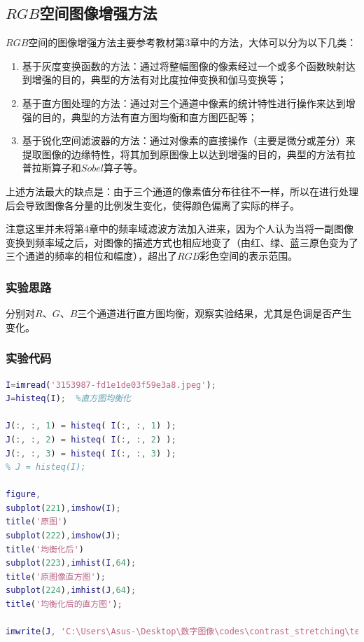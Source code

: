 \documentclass[UTF8]{ctexart}
\begin{document}
        \subsection{$RGB$空间图像增强方法}
            \indent $RGB$空间的图像增强方法主要参考教材\cite{digit_image_Gonzalez}第$3$章中的方法，大体可以分为以下几类：
            
                \begin{enumerate}[leftmargin=50pt]
                    \item 基于灰度变换函数的方法：通过将整幅图像的像素经过一个或多个函数映射达到增强的目的，典型的方法有对比度拉伸变换和伽马变换等；
    				\item 基于直方图处理的方法：通过对三个通道中像素的统计特性进行操作来达到增强的目的，典型的方法有直方图均衡和直方图匹配等；
    				\item 基于锐化空间滤波器的方法：通过对像素的直接操作（主要是微分或差分）来提取图像的边缘特性，将其加到原图像上以达到增强的目的，典型的方法有拉普拉斯算子和$Sobel$算子等。
    			\end{enumerate}              
                
           \indent 上述方法最大的缺点是：由于三个通道的像素值分布往往不一样，所以在进行处理后会导致图像各分量的比例发生变化，使得颜色偏离了实际的样子。
           
           \indent 注意这里并未将第$4$章中的频率域滤波方法加入进来，因为个人认为当将一副图像变换到频率域之后，对图像的描述方式也相应地变了（由红、绿、蓝三原色变为了三个通道的频率的相位和幅度），超出了$RGB$彩色空间的表示范围。
           
           \subsubsection{实验思路}
                \indent 分别对$R$、$G$、$B$三个通道进行直方图均衡，观察实验结果，尤其是色调是否产生变化。
           
           \subsubsection{实验代码}

       \begin{lstlisting}[language=Matlab,caption={分别对三个通道进行直方图均衡操作}]
%函数histeq（）进行直方图均衡化处理
I=imread('3153987-fd1e1de03f59e3a8.jpeg');
J=histeq(I);  %直方图均衡化

J(:, :, 1) = histeq( I(:, :, 1) );
J(:, :, 2) = histeq( I(:, :, 2) );
J(:, :, 3) = histeq( I(:, :, 3) );
% J = histeq(I);

figure,
subplot(221),imshow(I);
title('原图')
subplot(222),imshow(J);
title('均衡化后')
subplot(223),imhist(I,64);
title('原图像直方图');
subplot(224),imhist(J,64);
title('均衡化后的直方图');

imwrite(J, 'C:\Users\Asus-\Desktop\数字图像\codes\contrast_stretching\test.png');

       \end{lstlisting}
       
\end{document}
